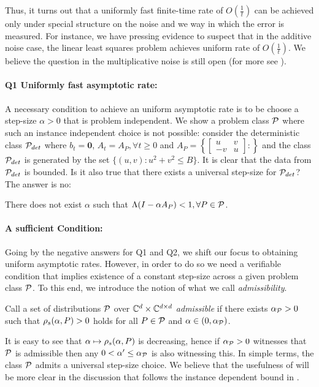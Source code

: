 Thus, it turns out that a uniformly fast finite-time rate of $O(\frac{1}{t})$ can be achieved only under special structure on the noise and we way in which the error is measured. For instance, we have pressing evidence to suspect that in the additive noise case, the linear least squares problem achieves uniform rate of $O(\frac{1}{t})$. We believe the question in the multiplicative noise is still open (for more see \cite{bach}).
\paragraph{Q1 Uniformly fast asymptotic rate:} A necessary condition to achieve an uniform asymptotic rate is to be choose a step-size $\alpha>0$ that is problem independent. 
We show a problem class $\P$ where such an instance independent choice is not possible: consider the deterministic class $\P_{det}$ where $b_t=\mathbf{0}$, $A_t=A_P, \forall t\geq 0$ and $A_P=\left\{\left[\begin{matrix} u &v \\ -v & u\end{matrix}\right] : \right\}$ and the class $\P_{det}$ is generated by the set $\{(u,v) : u^2+v^2\leq B\}$. It is clear that the data from $\P_{det}$ is bounded. Is it also true that there exists a universal step-size for $\P_{det}$? The answer is no:  
\begin{proposition}\label{prop:unistep}
There does not exist $\alpha$ such that $\Lambda(I-\alpha A_P)<1, \forall P\in \P$. 
\end{proposition}

\paragraph{A sufficient Condition:} Going by the negative answers for Q1 and Q2, we shift our focus to obtaining uniform asymptotic rates. However, in order to do so we need a verifiable condition that implies existence of a constant step-size across a given problem class $\P$. To this end, we introduce the notion of what we call \emph{admissibility}.
\begin{definition}\label{def:admis}
Call a set of distributions $\P$ over $\C^{d}\times \C^{\dcd}$
\emph{admissible} if there exists $\alpha_{\P}>0$ such that
$\rhos{P}>0$ holds for all $P\in \P$ and $\alpha\in(0,\alpha_{\P})$.
\end{definition}
It is easy to see that $\alpha \mapsto \rhos{P}$ is decreasing,
hence if $\alpha_{\P}>0$ witnesses that $\P$ is admissible
then any $0<\alpha'\le \alpha_{\P}$ is also witnessing this. In simple terms, the class $\P$ admits a universal step-size choice. We believe that the usefulness of 
 will be more clear in the discussion that follows the instance dependent bound in .


